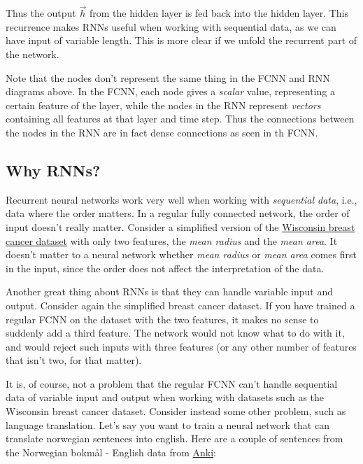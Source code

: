 \documentclass[11pt]{article}
\begin{document}
    

    Thus the output \(\vec{h}\) from the hidden layer is fed back into the
hidden layer. This recurrence makes RNNs useful when working with
sequential data, as we can have input of variable length. This is more
clear if we unfold the recurrent part of the network.

    

    Note that the nodes don't represent the same thing in the FCNN and RNN
diagrams above. In the FCNN, each node gives a \emph{scalar} value,
representing a certain feature of the layer, while the nodes in the RNN
represent \emph{vectors} containing all features at that layer and time
step. Thus the connections between the nodes in the RNN are in fact
dense connections as seen in th FCNN.

    

    \subsection{Why RNNs?}\label{why-rnns}

    Recurrent neural networks work very well when working with
\emph{sequential data}, i.e., data where the order matters. In a regular
fully connected network, the order of input doesn't really matter.
Consider a simplified version of the
\href{https://scikit-learn.org/stable/modules/generated/sklearn.datasets.load_breast_cancer.html}{Wisconsin
breast cancer dataset} with only two features, the \emph{mean radius}
and the \emph{mean area}. It doesn't matter to a neural network whether
\emph{mean radius} or \emph{mean area} comes first in the input, since
the order does not affect the interpretation of the data.

    Another great thing about RNNs is that they can handle variable input
and output. Consider again the simplified breast cancer dataset. If you
have trained a regular FCNN on the dataset with the two features, it
makes no sense to suddenly add a third feature. The network would not
know what to do with it, and would reject such inputs with three
features (or any other number of features that isn't two, for that
matter).

    It is, of course, not a problem that the regular FCNN can't handle
sequential data of variable input and output when working with datasets
such as the Wisconsin breast cancer dataset. Consider instead some other
problem, such as language translation. Let's say you want to train a
neural network that can translate norwegian sentences into english. Here
are a couple of sentences from the Norwegian bokmål - English data from
\href{https://www.manythings.org/anki/}{Anki}:
\end{document}
